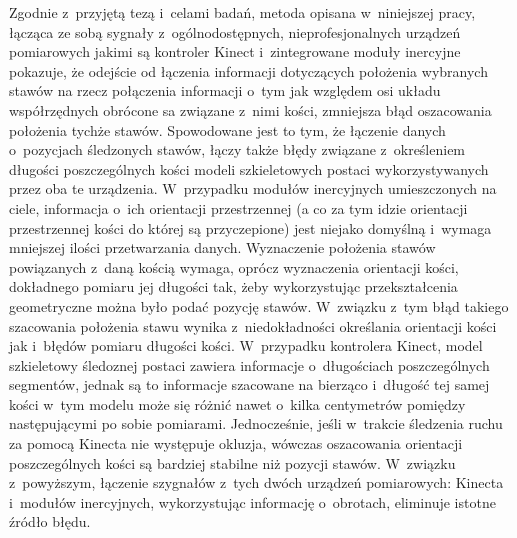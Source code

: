 Zgodnie z~przyjętą tezą i~celami badań, metoda opisana w~niniejszej pracy, łącząca ze sobą sygnały z~ogólnodostępnych, nieprofesjonalnych urządzeń pomiarowych jakimi są kontroler Kinect i~zintegrowane moduły inercyjne pokazuje, że odejście od łączenia informacji dotyczących położenia wybranych stawów na rzecz połączenia informacji o~tym jak względem osi układu współrzędnych obrócone sa związane z~nimi kości, zmniejsza błąd oszacowania położenia tychże stawów. Spowodowane jest to tym, że łączenie danych o~pozycjach śledzonych stawów, łączy także błędy związane z~określeniem długości poszczególnych kości modeli szkieletowych postaci wykorzystywanych przez oba te urządzenia. W~przypadku modułów inercyjnych umieszczonych na ciele, informacja o~ich orientacji przestrzennej (a co za tym idzie orientacji przestrzennej kości do której są przyczepione) jest niejako domyślną i~wymaga mniejszej ilości przetwarzania danych. Wyznaczenie położenia stawów powiązanych z~daną kością wymaga, oprócz wyznaczenia orientacji kości, dokładnego pomiaru jej długości tak, żeby wykorzystując przekształcenia geometryczne można było podać pozycję stawów. W~związku z~tym błąd takiego szacowania położenia stawu wynika z~niedokładności określania orientacji kości jak i~błędów pomiaru długości kości. W~przypadku kontrolera Kinect, model szkieletowy śledoznej postaci zawiera informacje o~długościach poszczególnych segmentów, jednak są to informacje szacowane na bierząco i~długość tej samej kości w~tym modelu może się różnić nawet o~kilka centymetrów pomiędzy następującymi po sobie pomiarami. Jednocześnie, jeśli w~trakcie śledzenia ruchu za pomocą Kinecta nie występuje okluzja, wówczas oszacowania orientacji poszczególnych kości są bardziej stabilne niż pozycji stawów. W~związku z~powyższym, łączenie szygnałów z~tych dwóch urządzeń pomiarowych: Kinecta i~modułów inercyjnych, wykorzystując informację o~obrotach, eliminuje istotne źródło błędu.\\

